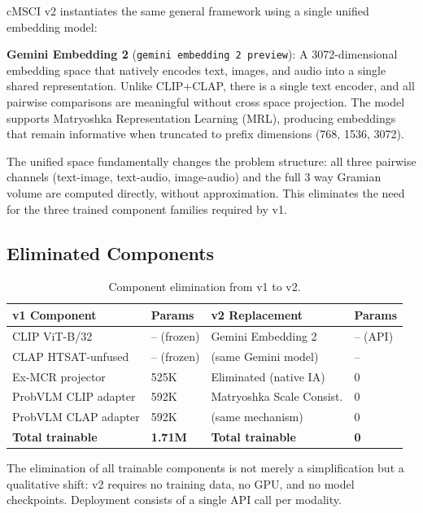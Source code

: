\documentclass[a4paper,fleqn]{cas-sc}
\begin{document}
\begin{itemize}
cMSCI v2 instantiates the same general framework using a single unified embedding model:

\textbf{Gemini Embedding 2} (\texttt{gemini embedding 2 preview}): A 3072-dimensional embedding space that natively encodes text, images, and audio into a single shared representation. Unlike CLIP+CLAP, there is a single text encoder, and all pairwise comparisons are meaningful without cross space projection. The model supports Matryoshka Representation Learning (MRL), producing embeddings that remain informative when truncated to prefix dimensions (768, 1536, 3072).

The unified space fundamentally changes the problem structure: all three pairwise channels (text-image, text-audio, image-audio) and the full 3 way Gramian volume are computed directly, without approximation. This eliminates the need for the three trained component families required by v1.

\subsection{Eliminated Components}\label{sec:v2-eliminated}

\begin{table}[t]
\caption{Component elimination from v1 to v2.}\label{tab:v2-elimination}
\centering
\small
\begin{tabular}{llll}
\toprule
v1 Component & Params & v2 Replacement & Params \\
\midrule
CLIP ViT-B/32 & -- (frozen) & Gemini Embedding 2 & -- (API) \\
CLAP HTSAT-unfused & -- (frozen) & (same Gemini model) & -- \\
Ex-MCR projector & 525K & Eliminated (native IA) & 0 \\
ProbVLM CLIP adapter & 592K & Matryoshka Scale Consist. & 0 \\
ProbVLM CLAP adapter & 592K & (same mechanism) & 0 \\

\midrule
\textbf{Total trainable} & \textbf{1.71M} & \textbf{Total trainable} & \textbf{0} \\
\bottomrule
\end{tabular}
\end{table}

The elimination of all trainable components is not merely a simplification but a qualitative shift: v2 requires no training data, no GPU, and no model checkpoints. Deployment consists of a single API call per modality.


\end{itemize}
\end{document}
